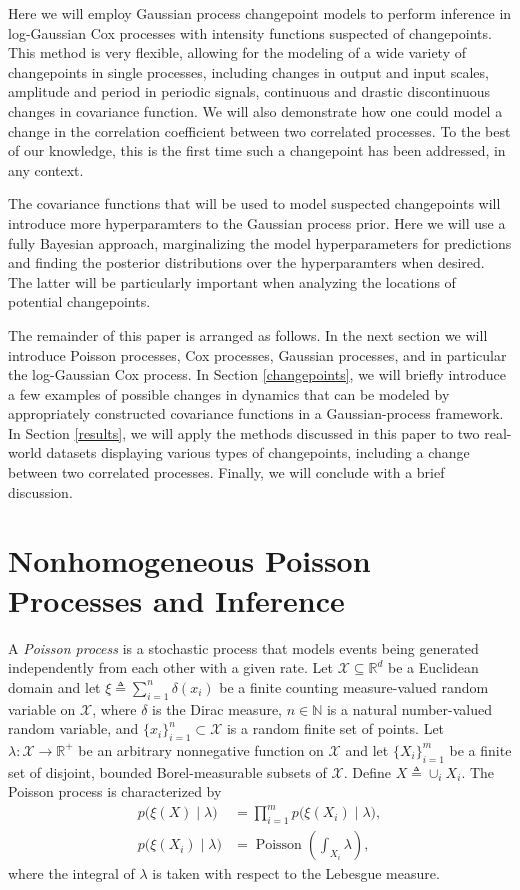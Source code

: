 \documentclass{article}
\newcommand{\deq}{\triangleq}
\newcommand{\cm}[1]{\mathcal{#1}}
\newcommand{\given}{\mid}
\newcommand{\R}{\mathbb{R}}
\newcommand{\N}{\mathbb{N}}
\DeclareMathOperator{\poisson}{Poisson}
\begin{document}
Here we will employ Gaussian process changepoint models to perform
inference in log-Gaussian Cox processes with intensity functions
suspected of changepoints.  This method is very flexible, allowing for
the modeling of a wide variety of changepoints in single processes,
including changes in output and input scales, amplitude and period in
periodic signals, continuous and drastic discontinuous changes in
covariance function.  We will also demonstrate how one could model a
change in the correlation coefficient between two correlated
processes.  To the best of our knowledge, this is the first time
such a changepoint has been addressed, in any context.

The covariance functions that will be used to model suspected
changepoints will introduce more hyperparamters to the Gaussian
process prior.  Here we will use a fully Bayesian approach,
marginalizing the model hyperparameters for predictions and finding
the posterior distributions over the hyperparamters when desired.  The
latter will be particularly important when analyzing the locations of
potential changepoints.

The remainder of this paper is arranged as follows.  In the next
section we will introduce Poisson processes, Cox processes, Gaussian
processes, and in particular the log-Gaussian Cox process.  In Section
\ref{changepoints}, we will briefly introduce a few examples of
possible changes in dynamics that can be modeled by appropriately
constructed covariance functions in a Gaussian-process framework.  In
Section \ref{results}, we will apply the methods discussed in this
paper to two real-world datasets displaying various types of
changepoints, including a change between two correlated processes.
Finally, we will conclude with a brief discussion.

\section{Nonhomogeneous Poisson Processes and Inference}
\label{poisson}

A \emph{Poisson process} is a stochastic process that models events
being generated independently from each other with a given rate.  Let
$\cm{X} \subseteq \R^d$ be a Euclidean domain and let $\xi \deq
\sum_{i = 1}^n \delta(x_i)$ be a finite counting measure-valued random
variable on $\cm{X}$, where $\delta$ is the Dirac measure, $n \in \N$
is a natural number-valued random variable, and $\lbrace x_i
\rbrace_{i = 1}^n \subset \cm{X}$ is a random finite set of points.
Let $\lambda\colon \cm{X} \to \R^+$ be an arbitrary nonnegative
function on $\cm{X}$ and let $\lbrace X_i \rbrace_{i = 1}^m$ be a
finite set of disjoint, bounded Borel-measurable subsets of $\cm{X}$.
Define $X \deq \cup_i X_i$.  The Poisson process is characterized by
\begin{align}
  p\bigl(\xi(X) \given \lambda \bigr) 
  &= 
  \prod_{i=1}^m p\bigl(\xi(X_i)\given \lambda \bigr),
  \nonumber
  \\
  p\bigl(\xi(X_i) \given \lambda \bigr)
  &=
  \poisson\left( \textstyle \int_{X_i} \lambda \right),
  \label{realprobability}
\end{align}
where the integral of $\lambda$ is taken with respect to the Lebesgue
measure.
\end{document}
